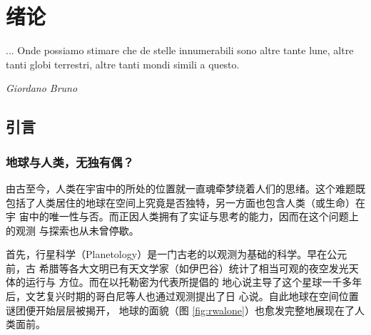 \chapter{绪论} \label{chapter:intro}

\epigraph{... Onde possiamo stimare che de stelle innumerabili sono altre tante lune, altre tanti globi terrestri, altre tanti mondi simili a questo.}{\textit{Giordano Bruno}}


\section{引言}
\subsection{地球与人类，无独有偶？}

由古至今，人类在宇宙中的所处的位置就一直魂牵梦绕着人们的思绪。这个难题既
包括了人类居住的地球在空间上究竟是否独特，另一方面也包含人类（或生命）在宇
宙中的唯一性与否。而正因人类拥有了实证与思考的能力，因而在这个问题上的观测
与探索也从未曾停歇。

首先，行星科学（Planetology）是一门古老的以观测为基础的科学。早在公元前，古
希腊等各大文明已有天文学家（如伊巴谷）统计了相当可观的夜空发光天体的运行与
方位\cite{Xuan1992, wikipedia_astronomer}。而在以托勒密为代表所提倡的
地心说主导了这个星球一千多年后，文艺复兴时期的哥白尼等人也通过观测提出了日
心说\cite{Copernicus1543}。自此地球在空间位置谜团便开始层层被揭开，
地球的面貌（图 \ref{fig:rwalone}）也愈发完整地展现在了人类面前。

